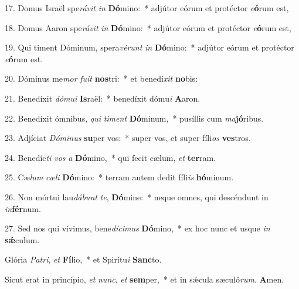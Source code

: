 \begin{latinenglishsection}
{	17. Domus Israël spe\textit{rá}\textit{vit} \textit{in} \textbf{Dó}mi\-no:~*
		adjútor eórum et protéctor \textit{e}\textbf{ó}rum est,
	
	18. Domus Aaron spe\textit{rá}\textit{vit} \textit{in} \textbf{Dó}mi\-no:~*
		adjútor eórum et protéctor \textit{e}\textbf{ó}rum est,
	
	19. Qui timent Dóminum, spera\textit{vé}\textit{runt} \textit{in} \textbf{Dó}mino:~*
		adjútor eórum et protéctor \textit{e}\textbf{ó}rum est.
	
	20. Dóminus me\textit{mor} \textit{fu}\textit{it} \textbf{nos}tri:~*
		et benedí\textit{xit} \textbf{no}bis:
	
	21. Benedíxit \textit{dó}\textit{mu}\textit{i} \textbf{Is}raël:~*
		benedíxit dómu\textit{i} \textbf{A}aron.
	
	22. Benedíxit ómnibus, \textit{qui} \textit{ti}\textit{ment} \textbf{Dó}minum,~*
		pusíllis cum \textit{ma}\textbf{jó}ribus.
	
	23. Adjíciat \textit{Dó}\textit{mi}\textit{nus} \textbf{su}per vos:~*
		super vos, et super fíli\textit{os} \textbf{ves}tros.
	
	24. Benedíc\textit{ti} \textit{vos} \textit{a} \textbf{Dó}mino,~*
		qui fecit cælum, \textit{et} \textbf{ter}ram.
	
	25. Cæ\textit{lum} \textit{cæ}\textit{li} \textbf{Dó}mino:~*
		terram autem dedit fíli\textit{is} \textbf{hó}minum.
	
	26. Non mórtui lau\textit{dá}\textit{bunt} \textit{te}, \textbf{Dó}mine:~*
		neque omnes, qui descéndunt in \textit{in}\textbf{fér}\-num.
	
	27. Sed nos qui vívimus, bene\textit{dí}\textit{ci}\textit{mus} \textbf{Dó}mino,~*
		ex hoc nunc et usque \textit{in} \textbf{s\'{\ae}}culum.
	
	Glória \textit{Pa}\textit{tri}, \textit{et} \textbf{Fí}lio,~*
		et Spirítu\textit{i} \textbf{Sanc}to.
	
	Sicut erat in princípio, \textit{et} \textit{nunc}, \textit{et} \textbf{sem}per,~*
		et in s\'{\ae}cula sæculó\textit{rum}. \textbf{A}men.
}{
	
}

\end{latinenglishsection}